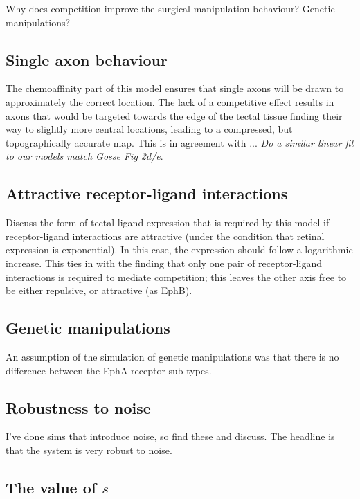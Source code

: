 \documentclass[11pt, a4paper]{article}
\begin{document}
Why does competition improve the surgical manipulation behaviour? Genetic manipulations?

\subsection*{Single axon behaviour}

The chemoaffinity part of this model ensures that single axons will be drawn to approximately the correct location. 
The lack of a competitive effect results in axons that would be targeted towards the edge of the tectal tissue finding their way to slightly more central locations, leading to a compressed, but topographically accurate map. 
This is in agreement with \citet{gosse_retinotopic_2008}... \emph{Do a similar linear fit to our models match Gosse Fig 2d/e}.

\subsection*{Attractive receptor-ligand interactions}

Discuss the form of tectal ligand expression that is required by this model if receptor-ligand interactions are attractive (under the condition that retinal expression is exponential). In this case, the expression should follow a logarithmic increase. This ties in with the finding that only one pair of receptor-ligand interactions is required to mediate competition; this leaves the other axis free to be either repulsive, or attractive (as EphB).

\subsection*{Genetic manipulations}

 An assumption of the simulation of genetic manipulations was that there is no difference between the EphA receptor sub-types.

\subsection*{Robustness to noise}

I've done sims that introduce noise, so find these and discuss. The headline is that the system is very robust to noise.

\subsection*{The value of $s$}
\end{document}
